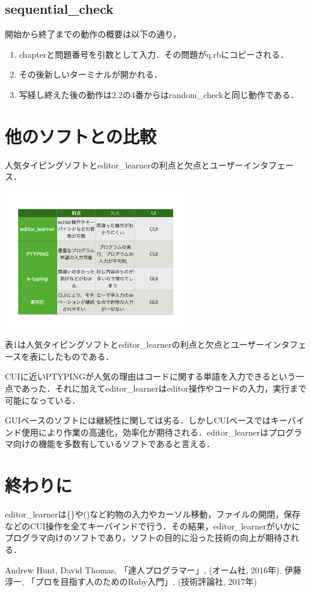 \documentclass[a4j,twocolumn]{jsarticle}
\def\tightlist{\itemsep1pt\parskip0pt\parsep0pt}
\begin{document}
\subsection{sequential\_check}
開始から終了までの動作の概要は以下の通り，
\begin{enumerate}
\def\labelenumi{\arabic{enumi}.}
\tightlist
\item
chapterと問題番号を引数として入力．その問題がq.rbにコピーされる．
\item
その後新しいターミナルが開かれる．
\item
写経し終えた後の動作は2.2の4番からはrandom\_checkと同じ動作である．
\end{enumerate}

\section{他のソフトとの比較}
\begin{table}[h]
\begin{center}
\caption{人気タイピングソフトとeditor\_learnerの利点と欠点とユーザーインタフェース．\label{sample}}
\centering\includegraphics[width=80mm]{../handout/ok/ok.jpeg}
\end{center}

\label{fig:This}
\end{table}
表1は人気タイピングソフトとeditor\_learnerの利点と欠点とユーザーインタフェースを表にしたものである．

CUIに近いPTYPINGが人気の理由はコードに関する単語を入力できるという一点であった．それに加えてeditor\_learnerはeditor操作やコードの入力，実行まで可能になっている．

GUIベースのソフトには継続性に関しては劣る．しかしCUIベースではキーバインド使用により作業の高速化，効率化が期待される．editor\_learnerはプログラマ向けの機能を多数有しているソフトであると言える．

\section{終わりに}
editor\_learnerは\{\}や()など約物の入力やカーソル移動，ファイルの開閉，保存などのCUI操作を全てキーバインドで行う．その結果，editor\_learnerがいかにプログラマ向けのソフトであり，ソフトの目的に沿った技術の向上が期待される．
\begin{thebibliography}{9}
 Andrew Hunt, David Thomas, 「達人プログラマー」, (オーム社, 2016年).
 伊藤淳一, 「プロを目指す人のためのRuby入門」, (技術評論社, 2017年)
\end{thebibliography}
\end{document}
